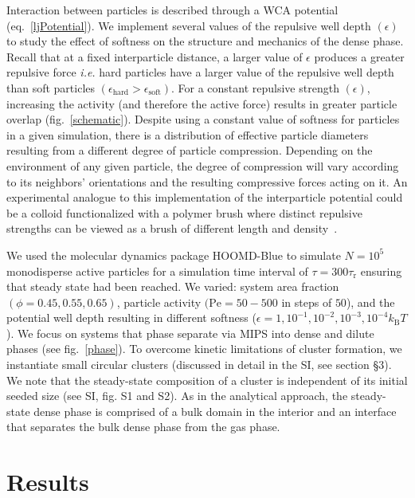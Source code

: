 \documentclass[twoside,twocolumn,9pt]{article}
\begin{document}
Interaction between particles is described through a WCA potential (eq.~\ref{ljPotential}). We implement several values of the repulsive well depth $(\epsilon)$ to study the effect of softness on the structure and mechanics of the dense phase. Recall that at a fixed interparticle distance, a larger value of $\epsilon$ produces a greater repulsive force \textit{i.e.} hard particles have a larger value of the repulsive well depth than soft particles $(\epsilon_{\text{hard}}>\epsilon_{\text{soft}})$. For a constant repulsive strength $(\epsilon)$, increasing the activity (and therefore the active force) results in greater particle overlap (fig.~\ref{schematic}). Despite using a constant value of softness for particles in a given simulation, there is a distribution of effective particle diameters resulting from a different degree of particle compression. Depending on the environment of any given particle, the degree of compression will vary according to its neighbors' orientations and the resulting compressive forces acting on it. An experimental analogue to this implementation of the interparticle potential could be a colloid functionalized with a polymer brush where distinct repulsive strengths can be viewed as a brush of different length and density~\cite{Vlassopoulos2012}.

 We used the molecular dynamics package HOOMD-Blue\cite{Anderson2020, Glaser2015, Anderson2008} to simulate $N=10^{5}$ monodisperse active particles for a simulation time interval of $\tau=300\tau_\text{r}$ ensuring that steady state had been reached. We varied: system area fraction $(\phi=0.45, 0.55, 0.65)$, particle activity $(\mathrm{Pe}=50-500$ in steps of $50$), and the potential well depth resulting in different softness ($\epsilon=1, 10^{-1}, 10^{-2}, 10^{-3}, 10^{-4} k_\text{B}T$). We focus on systems that phase separate via MIPS into dense and dilute phases (see fig.~\ref{phase}). To overcome kinetic limitations of cluster formation, we instantiate small circular clusters (discussed in detail in the SI, see section \S 3). We note that the steady-state composition of a cluster is independent of its initial seeded size (see SI, fig. S1 and S2). As in the analytical approach, the steady-state dense phase is comprised of a bulk domain in the interior and an interface that separates the bulk dense phase from the gas phase. 
 
\section{Results} \label{results}
\end{document}
